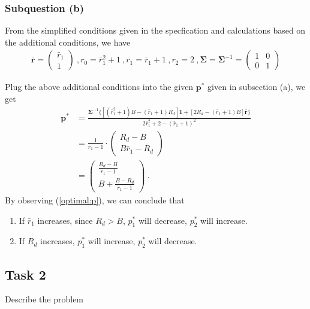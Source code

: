 \documentclass[12pt]{ftec2101}
\newcommand{\vect}[1]{\mathbf{#1}}
\begin{document}
\subsubsection{Subquestion (b)}
From the simplified conditions given in the specfication and calculations based on the additional conditions, we have 
\begin{align*}
    \bar{\vect{r}} =
    \begin{pmatrix}
        \bar{r}_1 \\
        1
    \end{pmatrix}\ ,
    r_0 = \bar{r}_1^2+1\ ,
    r_1 = \bar{r}_1 + 1\ , 
    r_2 = 2\ ,
    \boldsymbol{\Sigma} = \boldsymbol{\Sigma}^{-1} =
    \begin{pmatrix}
        1 & 0 \\
        0 & 1
    \end{pmatrix}
\end{align*}

\noindent
Plug the above additional conditions into the given $\vect{p}^{*}$ given in subsection (a), we get
\begin{align}
    \vect{p}^{*} &= \frac{\boldsymbol{\Sigma}^{-1}\{[(\bar{r}_1^2+1)B-(\bar{r}_1+1)R_d]\vect{1}+[2R_d - (\bar{r}_1 + 1)B]\bar{\vect{r}}\}}{2\bar{r}_1^2 + 2 - (\bar{r}_1+1)^2} \\
    &= \frac{1}{\bar{r}_1 - 1} \cdot
    \begin{pmatrix}
        R_d - B \\
        B\bar{r}_1 - R_d
    \end{pmatrix}\\
    &=
    \begin{pmatrix}
        \frac{R_d-B}{\bar{r}_1 - 1} \\
        B+ \frac{B-R_d}{\bar{r}_1 - 1}
    \end{pmatrix}\ .
    \label{optimal:p}
\end{align}
By observing (\ref{optimal:p}), we can conclude that
\begin{enumerate}
    \item If $\bar{r}_1$ increases, since $R_d > B$, $p_1^{*}$ will decrease, $p_2^{*}$ will increase.
    \item If $R_d$ increases, $p_1^{*}$ will increase, $p_2^{*}$ will decrease.
\end{enumerate}

\subsection{Task 2}
Describe the problem
\end{document}

